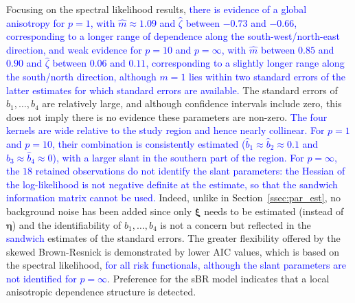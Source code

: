\documentclass[12pt]{article}
\newcommand{\PZ}{\textcolor{blue}}
\begin{document}
\begin{table}[!ht]
    \label{tab:parameter_estimates}
\end{table}

Focusing on the spectral likelihood results,
\PZ{there is evidence of a global anisotropy for $p=1$, with $\hat m\approx1.09$ and $\hat\zeta$ between $-0.73$ and $-0.66$, corresponding to a longer range of dependence along the south-west/north-east direction, and weak evidence for $p=10$ and $p=\infty$, with $\hat m$ between $0.85$ and $0.90$ and $\hat\zeta$ between $0.06$ and $0.11$, corresponding to a slightly longer range along the south/north direction, although $m=1$ lies within two standard errors of the latter estimates for which standard errors are available.}
%
The standard errors of 
$b_1,\ldots,b_4$ are relatively large, and although confidence intervals include zero, this does not imply there is no evidence these parameters are non-zero. 
\PZ{The four kernels are wide relative to the study region and hence nearly collinear. For $p=1$ and $p=10$, their combination is consistently estimated ($\hat b_1\approx\hat b_2\approx0.1$ and $\hat b_3\approx\hat b_4\approx0$), with a larger slant in the southern part of the region. For $p=\infty$, the $18$ retained observations do not identify the slant parameters: the Hessian of the log-likelihood is not negative definite at the estimate, so that the sandwich information matrix cannot be used.}
Indeed, unlike in Section~\ref{ssec:par_est}, no background noise has been added since only $\bm \xi$ needs to be estimated (instead of $\bm \eta$) and the identifiability of $b_1, \ldots, b_4$ is not a concern but reflected in the \PZ{sandwich} estimates of the standard errors.
%
The greater flexibility offered by the skewed Brown-Resnick is demonstrated by lower AIC values, which is based on the spectral likelihood, 
\PZ{for all risk functionals, although the slant parameters are not identified for $p=\infty$}.
Preference for the sBR model indicates that a local anisotropic dependence structure is detected.
\end{document}
